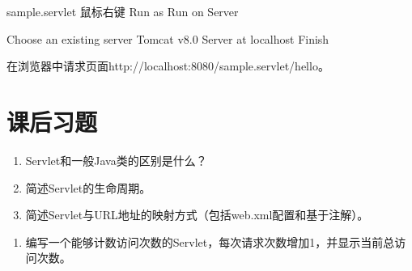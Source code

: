 sample.servlet  鼠标右键  Run as  Run on Server

  Choose an existing server  Tomcat v8.0 Server at localhost  Finish

在浏览器中请求页面{\Blue http://localhost:8080/sample.servlet/hello}。

\section{课后习题}


\begin{enumerate}
\item Servlet和一般Java类的区别是什么？
\item 简述Servlet的生命周期。
\item 简述Servlet与URL地址的映射方式（包括web.xml配置和基于注解）。
\end{enumerate}


\begin{enumerate}
\item 编写一个能够计数访问次数的Servlet，每次请求次数增加1，并显示当前总访问次数。
\end{enumerate}
